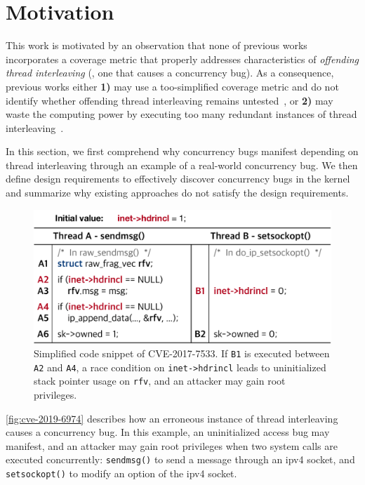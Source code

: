 \section{Motivation}
\label{s:motivation}


This work is motivated by an observation that none of previous works
incorporates a coverage metric that properly addresses characteristics
of \textit{offending thread interleaving} (\ie, one that causes a
concurrency bug).
%
As a consequence, previous works either \textbf{1)} may use a
too-simplified coverage metric and do not identify whether offending
thread interleaving remains untested~\cite{krace}, or \textbf{2)} may
waste the computing power by executing too many redundant instances of
thread interleaving~\cite{snowboard, razzer}.


In this section, we first comprehend why concurrency bugs manifest
depending on thread interleaving through an example of a real-world
concurrency bug.
%
We then define design requirements to effectively discover concurrency
bugs in the kernel and summarize why existing approaches do not
satisfy the design requirements.


%
\begin{figure}[t]
  \centering
  \includegraphics[width=0.95\linewidth]{fig/cve-2017-10661.pdf}
  \caption{Simplified code snippet of CVE-2017-7533. If \texttt{B1} is
    executed between \texttt{A2} and \texttt{A4}, a race condition on
    \texttt{inet->hdrincl} leads to uninitialized stack pointer usage
    on \texttt{rfv}, and an attacker may gain root privileges.}
  \label{fig:cve-2019-6974}
\end{figure}
%
\autoref{fig:cve-2019-6974} describes how an erroneous instance of
thread interleaving causes a concurrency bug.
%
In this example, an uninitialized access bug may manifest, and an
attacker may gain root privileges when two system calls are executed
concurrently: \texttt{sendmsg()} to send a message through an ipv4
socket, and \texttt{setsockopt()} to modify an option of the ipv4
socket.




